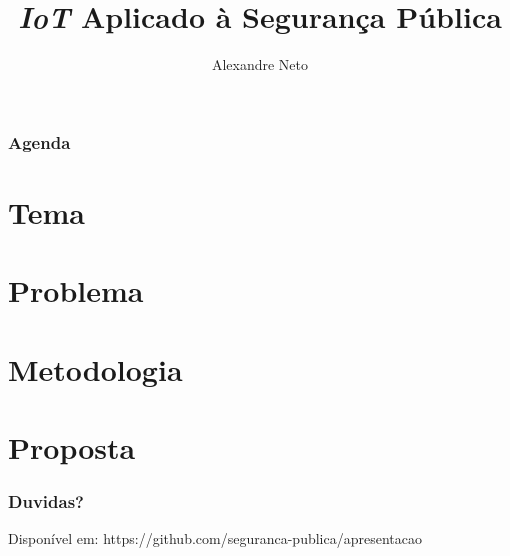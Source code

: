 \documentclass[14pt]{beamer}
\author{Alexandre Neto}
\title{\textit{IoT} Aplicado à Segurança Pública}
\institute{
	Análise e Desenvolvimento de Sistemas\\
	Fatec-SJC
	}
\begin{document}
\begin{frame}
\titlepage
\end{frame}

\begin{frame}
\frametitle{Agenda}
\tableofcontents
\end{frame}

\section{Tema}


\section{Problema}


\section{Metodologia}


\section{Proposta}


\begin{frame}
	\frametitle{Duvidas?}
	Disponível em:
	https://github.com/seguranca-publica/apresentacao
\end{frame}

	
\end{document}
